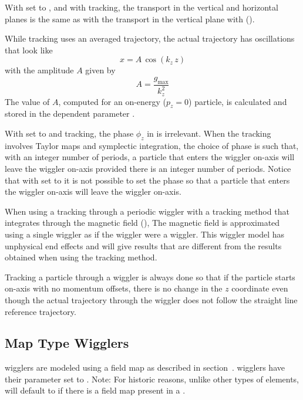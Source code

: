 {With  set to , and with  tracking, the transport
in the vertical and horizontal planes is the same as with the transport in the vertical plane with
 ().

While  tracking uses an averaged trajectory, the actual trajectory has oscillations 
that look like
\begin{equation}
  x = A \, \cos (k_z \, z)
\end{equation}
with the amplitude $A$ given by
\begin{equation}
  A = \frac{g_\text{max}}{k_z^2}
\end{equation}
The value of $A$, computed for an on-energy ($p_z = 0$) particle, is calculated and stored in the
dependent parameter .

With  set to  and  tracking, the phase $\phi_z$ in
 is irrelevant. When the tracking involves Taylor maps and symplectic integration, the
choice of phase is such that, with an integer number of periods, a particle that enters the wiggler
on-axis will leave the wiggler on-axis provided there is an integer number of periods. Notice that with
 set to  it is not possible to set the phase so that a particle
that enters the wiggler on-axis will leave the wiggler on-axis. 

When using a tracking through a periodic wiggler with a tracking method that integrates through the
magnetic field (), The magnetic field is approximated using a single wiggler 
as if the wiggler were a  wiggler. This wiggler model has unphysical end effects and
will give results that are different from the results obtained when using the 
tracking method.

Tracking a particle through a wiggler is always done so that if the particle starts on-axis with no
momentum offsets, there is no change in the $z$ coordinate even though the actual trajectory through
the wiggler does not follow the straight line reference trajectory.

\subsection{Map Type Wigglers}
\label{s:wiggler.map}

 wigglers are modeled using a field map as described in section~.
 wigglers have their  parameter set to . Note: For historic
reasons, unlike other types of elements,  will default to  if there is a
field map present in a .

}
